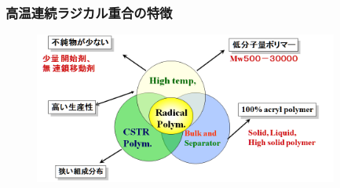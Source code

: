 \documentclass[12pt, dvipdfmx]{beamer}
\begin{document}
%
\begin{frame}
	\frametitle{高温連続ラジカル重合の特徴}
		\begin{figure}[!b]
			\begin{center}
				\includegraphics[width=100mm]{tokutyo.png}
			\end{center}
		\end{figure}
\end{frame}
\end{document}
